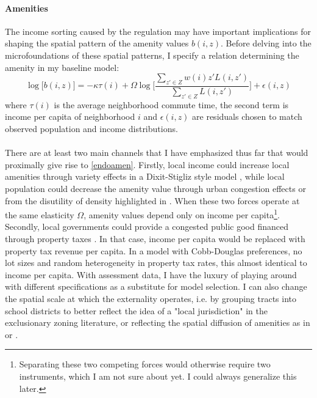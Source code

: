 \documentclass[]{article}
\begin{document}
 \paragraph*{Amenities} 
 The income sorting caused by the regulation may have important implications for shaping the spatial pattern of the amenity values $b(i, z)$. Before delving into the microfoundations of these spatial patterns, I specify a relation determining the amenity in my baseline model:
 \begin{equation}\label{endoamen}
 	\log\big[b(i, z)\big] = -\kappa\tau(i) + \Omega\log\bigg[\frac{\sum_{z' \in Z}w(i)z'L(i, z')}{\sum_{z' \in Z}L(i, z')}\bigg] + \epsilon(i, z)
 \end{equation}
 where $\tau(i)$ is the average neighborhood commute time, the second term is income per capita of neighborhood $i$ and $\epsilon(i, z)$ are residuals chosen to match observed population and income distributions. 
 
 \paragraph*{}
 There are at least two main channels that I have emphasized thus far that would proximally give rise to \eqref{endoamen}. Firstly, local income could increase local amenities through variety effects in a Dixit-Stigliz style model \citep{AlmagroDI} \citep{Coutureetal}, while local population could decrease the amenity value through urban congestion effects or from the disutility of density highlighted in \citep{KSC}. When these two forces operate at the same elasticity $\Omega$, amenity values depend only on income per capita\footnote{Separating these two competing forces would otherwise require two instruments, which I am not sure about yet. I could always generalize this later.}. Secondly, local governments could provide a congested public good financed through property taxes \citep{calabresetal}. In that case, income per capita would be replaced with property tax revenue per capita. In a model with Cobb-Douglas preferences, no lot sizes and random heterogeneity in property tax rates, this almost identical to income per capita. With assessment data, I have the luxury of playing around with different specifications as a substitute for model selection. I can also change the spatial scale at which the externality operates, i.e. by grouping tracts into school districts to better reflect the idea of a "local jurisdiction" in the exclusionary zoning literature, or reflecting the spatial diffusion of amenities as in \cite{travelamen} or \cite{suamenities}.
\end{document}
